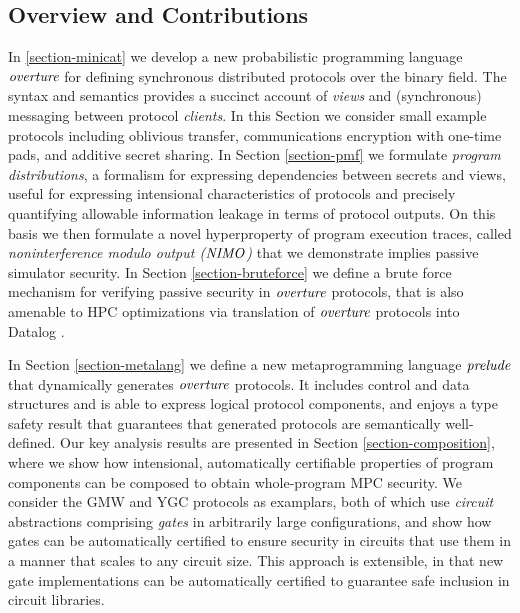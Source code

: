 \subsection{Overview and Contributions}

In \ref{section-minicat} we develop a new probabilistic programming
language $\mathit{overture}$ for defining synchronous distributed protocols
over the binary field. The syntax and semantics provides a succinct
account of \emph{views} and (synchronous) messaging between protocol
\emph{clients}. In this Section we consider small example protocols
including oblivious transfer, communications encryption with one-time
pads, and additive secret sharing. In Section \ref{section-pmf} we
formulate \emph{program distributions}, a formalism for expressing
dependencies between secrets and views, useful for expressing
intensional characteristics of protocols and precisely quantifying
allowable information leakage in terms of protocol outputs. On this
basis we then formulate a novel hyperproperty of program execution
traces, called \emph{noninterference modulo output ($\mathit{NIMO}$)} that we
demonstrate implies passive simulator security. In Section
\ref{section-bruteforce} we define a brute force mechanism for
verifying passive security in $\mathit{overture}$ protocols, that is also
amenable to HPC optimizations via translation of $\mathit{overture}$ protocols
into Datalog .

In Section \ref{section-metalang} we define a new metaprogramming
language $\mathit{prelude}$ that dynamically generates $\mathit{overture}$
protocols. It includes control and data structures and is able to
express logical protocol components, and enjoys a type safety result
that guarantees that generated protocols are semantically
well-defined. Our key analysis results are presented in Section
\ref{section-composition}, where we show how intensional,
automatically certifiable properties of program components can be
composed to obtain whole-program MPC security. We consider the GMW and
YGC protocols as examplars, both of which use \emph{circuit}
abstractions comprising \emph{gates} in arbitrarily large
configurations, and show how gates can be automatically certified to
ensure security in circuits that use them in a manner that scales to
any circuit size. This approach is extensible, in that new gate
implementations can be automatically certified to guarantee safe
inclusion in circuit libraries.
